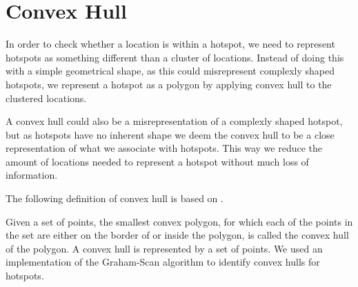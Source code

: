 \section{Convex Hull}\label{convex_hull}
In order to check whether a location is within a hotspot, we need to represent hotspots as something different than a cluster of locations.
Instead of doing this with a simple geometrical shape, as this could misrepresent complexly shaped hotspots, we represent a hotspot as a polygon by applying convex hull to the clustered locations.

A convex hull could also be a misrepresentation of a complexly shaped hotspot, but as hotspots have no inherent shape we deem the convex hull to be a close representation of what we associate with hotspots.
This way we reduce the amount of locations needed to represent a hotspot without much loss of information.

The following definition of convex hull is based on \citet[Section 33.3]{aadbook}.

Given a set of points, the smallest convex polygon, for which each of the points in the set are either on the border of or inside the polygon, is called the convex hull of the polygon\cite[Section 33.1-5]{aadbook}.
A convex hull is represented by a set of points.
We used an implementation of the Graham-Scan\cite[Page 1031]{aadbook} algorithm to identify convex hulls for hotspots.
